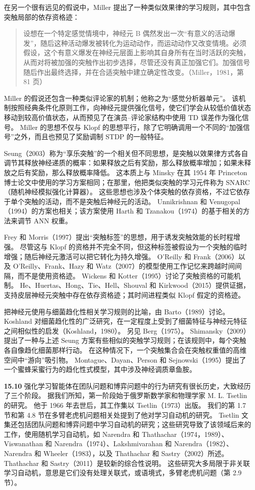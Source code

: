\documentclass[UTF8,12pt,a4paper,fontset=fandol]{ctexart}
\begin{document}
在另一个很有远见的假说中，Miller 提出了一种类似效果律的学习规则，其中包含突触局部的依存资格迹：
\begin{quote}
设想在一个特定感觉情境中，神经元 B 偶然发出一次“有意义的活动爆发”，随后这种活动爆发被转化为运动动作，而运动动作又改变情境。必须假设，这个有意义爆发在神经元层面上影响其自身所有在当时活跃的突触，从而对将被加强的突触作出初步选择，尽管还没有真正加强它们。加强信号随后作出最终选择，并在合适突触中建立确定性改变。（Miller，1981，第 81 页）
\end{quote}
Miller 的假说还包含一种类似评论家的机制；他称之为“感觉分析器单元”。
该机制按照经典条件化原则工作，向神经元提供强化信号，使它们学会从较低价值状态移动到较高价值状态，从而预见了在演员--评论家结构中使用 TD 误差作为强化信号。
Miller 的思想不仅与 Klopf 的思想平行，除了它明确调用一个不同的“加强信号”之外，而且也预见了奖励调制 STDP 的一般特征。

Seung（2003）称为“享乐突触”的一个相关但不同思想，是突触以效果律方式各自调节其释放神经递质的概率：如果释放之后有奖励，那么释放概率增加；如果未释放之后有奖励，那么释放概率降低。
这本质上与 Minsky 在其 1954 年 Princeton 博士论文中使用的学习方案相同；在那里，他把类似突触的学习元件称为 SNARC（随机神经模拟强化计算器）。
这些思想也涉及个体突触的依存资格，不过它依存于单个突触的活动，而不是突触后神经元的活动。
Unnikrishnan 和 Venugopal（1994）的方案也相关；该方案使用 Harth 和 Tzanakou（1974）的基于相关的方法来调节 ANN 权重。

Frey 和 Morris（1997）提出“突触标签”的思想，用于诱发突触效能的长时程增强。
尽管这与 Klopf 的资格并不完全不同，但这种标签被假设为一个突触的临时增强；随后神经元激活可以把它转化为持久增强。
O'Reilly 和 Frank（2006）以及 O'Reilly、Frank、Hazy 和 Watz（2007）的模型使用工作记忆来跨越时间间隔，而不是使用资格迹。
Wickens 和 Kotter（1995）讨论了突触资格的可能机制。
He、Huertas、Hong、Tie、Hell、Shouval 和 Kirkwood（2015）提供证据，支持皮层神经元突触中存在依存资格迹；其时间进程类似 Klopf 假定的资格迹。

把神经元使用与细菌趋化性相关学习规则的比喻，由 Barto（1989）讨论。
Koshland 对细菌趋化性的广泛研究，在一定程度上受到了细菌特征与神经元特征之间相似性的启发（Koshland，1980）。
另见 Berg（1975）。
Shimansky（2009）提出了一种与上述 Seung 方案有些相似的突触学习规则；在该规则中，每个突触各自像趋化细菌那样行动。
在这种情况下，一个突触集合会在突触权重值的高维空间中“游向”吸引物。
Montague、Dayan、Person 和 Sejnowski（1995）提出了一个蜜蜂采蜜行为的趋化性式模型，其中涉及神经调质章鱼胺。

\noindent\textbf{15.10}
强化学习智能体在团队问题和博弈问题中的行为研究有很长历史，大致经历了三个阶段。
据我们所知，第一阶段始于俄罗斯数学家和物理学家 M. L. Tsetlin 的研究。
他于 1966 年去世后，其工作集以 Tsetlin（1973）出版。
我们的第 1.7 节和第 4.8 节在多臂老虎机问题相关处提到了他对学习自动机的研究。
Tsetlin 文集还包括团队问题和博弈问题中学习自动机的研究；这些研究导致了该领域后来的工作，使用随机学习自动机，如 Narendra 和 Thathachar（1974，1989）、Viswanathan 和 Narendra（1974）、Lakshmivarahan 和 Narendra（1982）、Narendra 和 Wheeler（1983），以及 Thathachar 和 Sastry（2002）所述。
Thathachar 和 Sastry（2011）是较新的综合性说明。
这些研究大多局限于非关联学习自动机，意思是它们没有处理关联式，或语境式，多臂老虎机问题（第 2.9 节）。
\end{document}
